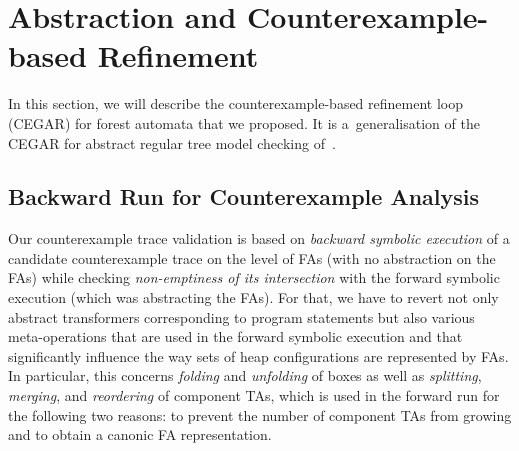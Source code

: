 \section{Abstraction and Counterexample-based Refinement}\label{sec:CEGAR}
In this section, we will describe the counterexample-based refinement loop (CEGAR) for forest automata
that we proposed.
It is a~generalisation of the CEGAR for abstract regular tree model checking of~\cite{bhrv06a,bhrv06b}. 


\subsection{Backward Run for Counterexample Analysis}\label{sec:CEXanalysis}

Our counterexample trace validation is based on \emph{backward symbolic execution} of
a candidate counterexample trace on the level of FAs (with no abstraction on the
FAs) while checking \emph{non-emptiness of its intersection} with the forward
symbolic execution (which was abstracting the FAs). For that, we have to revert
not only abstract transformers corresponding to program statements but also
various meta-operations that are used in the forward symbolic execution and that
significantly influence the way sets of heap configurations are represented by
FAs. In particular, this concerns \emph{folding} and \emph{unfolding} of boxes
as well as \emph{splitting}, \emph{merging},
and \emph{reordering} of component TAs, which is used in the forward run for the
following two reasons: to
prevent the number of component TAs from growing and to obtain a canonic
FA representation. 

